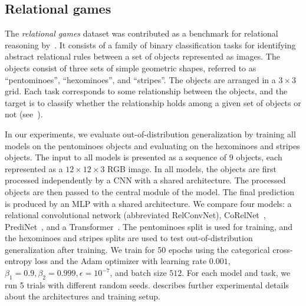 \subsection{Relational games}\label{ssec:exp_relational_games}

The \textit{relational games} dataset was contributed as a benchmark for relational reasoning by~\citep{shanahanExplicitlyRelationalNeural}. It consists of a family of binary classification tasks for identifying abstract relational rules between a set of objects represented as images. The objects consist of three sets of simple geometric shapes, referred to as ``pentominoes'', ``hexominoes'', and ``stripes''. The objects are arranged in a $3 \times 3$ grid. Each task corresponds to some relationship between the objects, and the target is to classify whether the relationship holds among a given set of objects or not (see~).

In our experiments, we evaluate out-of-distribution generalization by training all models on the pentominoes objects and evaluating on the hexominoes and stripes objects. The input to all models is presented as a sequence of $9$ objects, each represented as a $12 \times 12 \times 3$ RGB image. In all models, the objects are first processed independently by a CNN with a shared architecture. The processed objects are then passed to the central module of the model. The final prediction is produced by an MLP with a shared architecture. We compare four models: a relational convolutional network (abbreviated RelConvNet), CoRelNet~\citep{kergNeuralArchitecture2022}, PrediNet~\citep{shanahanExplicitlyRelationalNeural}, and a Transformer~\citep{vaswani2017attention}. The pentominoes split is used for training,
and the hexominoes and stripes splits are used to test out-of-distribution generalization after training. 
We train for 50 epochs using the categorical cross-entropy loss and the Adam optimizer with learning rate $0.001$, $\beta_1 = 0.9, \beta_2 = 0.999, \epsilon = 10^{-7}$, and batch size $512$. For each model and task, we run 5 trials with different random seeds.
 describes further experimental details about the architectures and training setup.

